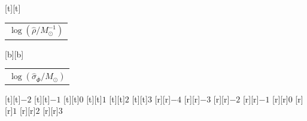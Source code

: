 %    
%
%
\begin{psfrags}%
\psfragscanon%
%
[t][t]{\color[rgb]{0,0,0}\setlength{\tabcolsep}{0pt}\begin{tabular}{c}{\Large$\log\left(\hat{\rho}/M_\odot^{-1}\right)$}\end{tabular}}%
[b][b]{\color[rgb]{0,0,0}\setlength{\tabcolsep}{0pt}\begin{tabular}{c}{\Large$\log\left(\hat{\sigma}_{\overline{\Phi}}/M_\odot\right)$}\end{tabular}}%
%
[t][t]{$-2$}%
[t][t]{$-1$}%
[t][t]{$0$}%
[t][t]{$1$}%
[t][t]{$2$}%
[t][t]{$3$}%
%
[r][r]{$-4$}%
[r][r]{$-3$}%
[r][r]{$-2$}%
[r][r]{$-1$}%
[r][r]{$0$}%
[r][r]{$1$}%
[r][r]{$2$}%
[r][r]{$3$}%
%
%
\end{psfrags}%
%
